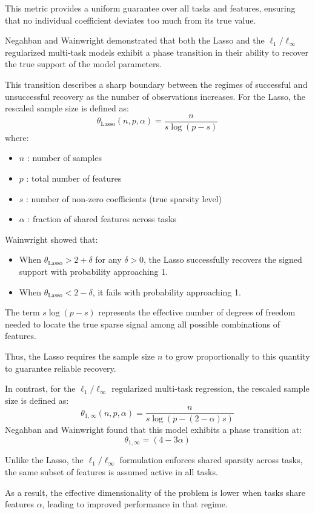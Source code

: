 \documentclass{article}
\begin{document}
This metric provides a uniform guarantee over all tasks and features, ensuring that no individual coefficient deviates too much from its true value.

Negahban and Wainwright demonstrated that both the Lasso and the $\ell_1/\ell_\infty$ regularized multi-task models exhibit a phase transition in their ability to recover the true support of the model parameters.

This transition describes a sharp boundary between the regimes of successful and unsuccessful recovery as the number of observations increases.
For the Lasso, the rescaled sample size is defined as:
$$\theta_{\text{Lasso}}(n, p, \alpha) = \frac{n}{s \log(p - s)}$$
where:
\begin{itemize}
    \item $n$ : number of samples
    \item $p$ : total number of features
    \item $s$ : number of non-zero coefficients (true sparsity level)
    \item $\alpha$ : fraction of shared features across tasks
\end{itemize}
Wainwright showed that:
\begin{itemize}
    \item When $\theta_{\text{Lasso}} > 2 + \delta$ for any $\delta > 0$, the Lasso successfully recovers the signed support with probability approaching 1.
    \item When $\theta_{\text{Lasso}} < 2 - \delta$, it fails with probability approaching 1.
\end{itemize}
The term $s \log(p - s)$ represents the effective number of degrees of freedom needed to locate the true sparse signal among all possible combinations of features.

Thus, the Lasso requires the sample size $n$ to grow proportionally to this quantity to guarantee reliable recovery.

In contrast, for the $\ell_1/\ell_{\infty}$ 
regularized multi-task regression, the rescaled sample size is defined as:
$$\theta_{1,\infty}(n, p, \alpha) = \frac{n}{s \log(p - (2 - \alpha)s)}$$
Negahban and Wainwright found that this model exhibits a phase transition at:
$$\theta_{1,\infty} = (4 - 3\alpha)$$

Unlike the Lasso, the $\ell_1/\ell_{\infty}$ formulation enforces shared sparsity across tasks, the same subset of features is assumed active in all tasks.

As a result, the effective dimensionality of the problem is lower when tasks share features $\alpha$, leading to improved performance in that regime.
\end{document}
